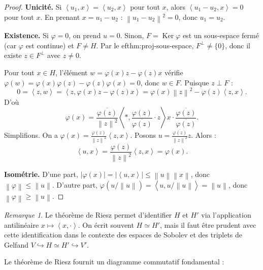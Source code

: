 \documentclass[a4paper,12pt]{book}
\DeclareMathOperator{\Id}{Id}
\DeclareMathOperator{\Ker}{Ker}
\newcommand{\norm}[1]{\left\| #1 \right\|}
\newcommand{\abs}[1]{\left| #1 \right|}
\newcommand{\inner}[2]{\left\langle #1, #2 \right\rangle}
\theoremstyle{definition}
\theoremstyle{plain}
\theoremstyle{remark}
\newtheorem{remarque}[definition]{Remarque}
\begin{document}
\begin{proof}
\textbf{Unicité.} Si $\inner{u_1}{x} = \inner{u_2}{x}$ pour tout $x$, alors $\inner{u_1 - u_2}{x} = 0$ pour tout $x$. En prenant $x = u_1 - u_2$ : $\norm{u_1 - u_2}^2 = 0$, donc $u_1 = u_2$.

\textbf{Existence.} Si $\varphi = 0$, on prend $u = 0$. Sinon, $F = \Ker\varphi$ est un sous-espace fermé (car $\varphi$ est continue) et $F \neq H$. Par le 
ef{thm:proj-sous-espace}, $F^\perp \neq \{0\}$, donc il existe $z \in F^\perp$ avec $z \neq 0$.

Pour tout $x \in H$, l'élément $w = \varphi(x)z - \varphi(z)x$ vérifie $\varphi(w) = \varphi(x)\varphi(z) - \varphi(z)\varphi(x) = 0$, donc $w \in F$. Puisque $z \perp F$ :
\[
    0 = \inner{z}{w} = \inner{z}{\varphi(x)z - \varphi(z)x} = \varphi(x)\norm{z}^2 - \varphi(z)\inner{z}{x}.
\]
D'où
\[
    \varphi(x) = \frac{\overline{\varphi(z)}}{\norm{z}^2}\inner*{\frac{\varphi(z)}{\overline{\varphi(z)}} \cdot z}{x} \cdot \frac{\overline{\varphi(z)}}{\overline{\varphi(z)}}.
\]
Simplifions. On a $\varphi(x) = \frac{\varphi(z)}{\norm{z}^2}\inner{z}{x}$. Posons $u = \frac{\overline{\varphi(z)}}{\norm{z}^2} z$. Alors :
\[
    \inner{u}{x} = \frac{\varphi(z)}{\norm{z}^2}\inner{z}{x} = \varphi(x).
\]

\textbf{Isométrie.} D'une part, $\abs{\varphi(x)} = \abs{\inner{u}{x}} \leq \norm{u}\norm{x}$, donc $\norm{\varphi} \leq \norm{u}$. D'autre part, $\varphi(u/\norm{u}) = \inner{u}{u/\norm{u}} = \norm{u}$, donc $\norm{\varphi} \geq \norm{u}$.
\end{proof}

\begin{remarque}\label{rem:riesz-identification}
Le théorème de Riesz permet d'identifier $H$ et $H'$ via l'application antilinéaire $x \mapsto \inner{x}{\cdot}$. On écrit souvent $H \simeq H'$, mais il faut être prudent avec cette identification dans le contexte des espaces de Sobolev et des triplets de Gelfand $V \hookrightarrow H \simeq H' \hookrightarrow V'$.
\end{remarque}

Le théorème de Riesz fournit un diagramme commutatif fondamental :
\begin{center}
\label{fig:riesz-diag}
\end{center}
\end{document}
